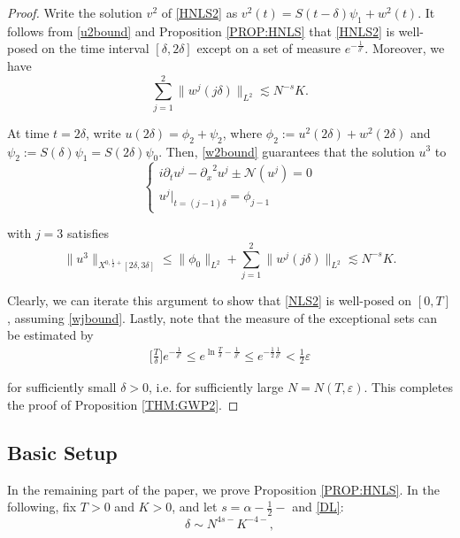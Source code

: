 \documentclass[11pt]{amsart}
\numberwithin{equation}{section} \numberwithin{theorem}{section}
\begin{document}
\begin{proof}
	Write the solution $v^2$ of \eqref{HNLS2} as $v^2 (t) = S(t-{\delta})\psi_1 + w^2(t)$. It follows from \eqref{u2bound} and Proposition \ref{PROP:HNLS} that \eqref{HNLS2} is well-posed on the time interval $[{\delta}, 2{\delta}]$ except on a set of measure $e^{-\frac{1}{{\delta}^c}}$. Moreover, we have 
	\begin{equation}
		\label{w2bound} \sum_{j = 1}^2 \|w^j(j{\delta})\|_{L^2} \lesssim N^{-s}K. 
	\end{equation}
	
	At time $t = 2{\delta}$, write $u (2{\delta}) = \phi_2 + \psi_2$, where $\phi_2 := u^2(2{\delta}) + w^2(2{\delta})$ and $\psi_2 := S({\delta}) \psi_1 = S(2{\delta}) \psi_0$. Then, \eqref{w2bound} guarantees that the solution $u^3$ to 
	\begin{equation}
		\label{LNLSj} 
		\begin{cases}
			i {
\partial_t} u^j - {
\partial_x}^2 u^j \pm \mathcal{N}(u^j) = 0 \\
			u^j|_{t= (j-1) {\delta}} = \phi_{j-1} 
		\end{cases}
	\end{equation}
	
	{
\noindent} with $j = 3$ satisfies 
	\begin{equation}
		\label{u3bound} \| u^3 \|_{X^{0, \frac{1}{2}+}[2{\delta}, 3{\delta}]} \leq \| \phi_0 \|_{L^2} + \sum_{j = 1}^2 \|w^j(j{\delta})\|_{L^2} \lesssim N^{-s}K. 
	\end{equation}
	
	Clearly, we can iterate this argument to show that \eqref{NLS2} is well-posed on $[0, T]$, assuming \eqref{wjbound}. Lastly, note that the measure of the exceptional sets can be estimated by 
	\begin{align*}
		\Big[\frac{T}{\delta}\Big] e^{-\frac{1}{{\delta}^c}} \leq e^{\ln \frac{T}{\delta} -\frac{1}{{\delta}^c}} \leq e^{ -\frac{1}{2}\frac{1}{{\delta}^c}} < \frac{1}{2}{\varepsilon} 
	\end{align*}
	
	{
\noindent} for sufficiently small ${\delta} >0$, i.e. for sufficiently large $N = N(T, {\varepsilon})$. This completes the proof of Proposition \ref{THM:GWP2}. 
\end{proof}

\subsection{Basic Setup} \label{SUBSEC:GWP2}

In the remaining part of the paper, we prove Proposition \ref{PROP:HNLS}. In the following, fix $T> 0 $ and $K > 0$, and let $ s= {\alpha} - \frac{1}{2}-$ and \eqref{DL}:
\begin{equation*}
	{\delta} \sim N^{4s-} K^{-4-}, 
\end{equation*}
\end{document}

